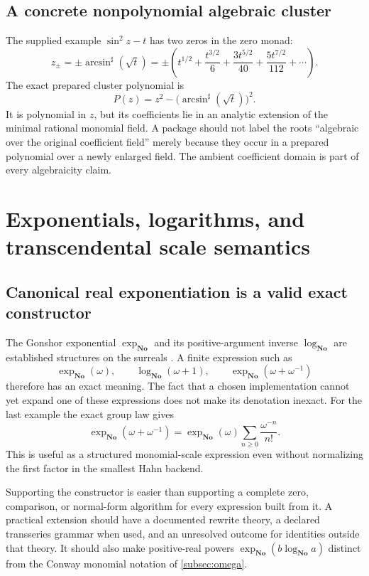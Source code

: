 \documentclass[11pt,letterpaper]{article}
\numberwithin{equation}{section}
\theoremstyle{definition}
\theoremstyle{remark}\newtheorem{remark}[theorem]{Remark}
\newcommand{\No}{\mathbf{No}}
\newcommand{\sh}{^{\sharp}}
\begin{document}
\subsection{A concrete nonpolynomial algebraic cluster}
The supplied example $\sin^2z-t$ has two zeros in the zero monad:
\[
 z_\pm=\pm\arcsin\sh(\sqrt t)
 =\pm\left(t^{1/2}+\frac{t^{3/2}}6+
 \frac{3t^{5/2}}{40}+\frac{5t^{7/2}}{112}+\cdots\right).
\]
The exact prepared cluster polynomial is
\[
 P(z)=z^2-\bigl(\arcsin\sh(\sqrt t)\bigr)^2.
\]
It is polynomial in $z$, but its coefficients lie in an analytic extension
of the minimal rational monomial field. A package should not label the roots
``algebraic over the original coefficient field'' merely because they occur
in a prepared polynomial over a newly enlarged field. The ambient coefficient
domain is part of every algebraicity claim.

\section{Exponentials, logarithms, and transcendental scale semantics}
\label{sec:transcendental}

\subsection{Canonical real exponentiation is a valid exact constructor}
The Gonshor exponential $\exp_{\No}$ and its positive-argument inverse
$\log_{\No}$ are established structures on the surreals
\cite{Gonshor,vdDE}. A finite expression such as
\[
 \exp_{\No}(\omega),\qquad
 \log_{\No}(\omega+1),\qquad
 \exp_{\No}(\omega+\omega^{-1})
\]
therefore has an exact meaning. The fact that a chosen implementation cannot
yet expand one of these expressions does not make its denotation inexact.
For the last example the exact group law gives
\[
 \exp_{\No}(\omega+\omega^{-1})
 =\exp_{\No}(\omega)\sum_{n\ge0}\frac{\omega^{-n}}{n!}.
\]
This is useful as a structured monomial-scale expression even without
normalizing the first factor in the smallest Hahn backend.

Supporting the constructor is easier than supporting a complete zero,
comparison, or normal-form algorithm for every expression built from it.
A practical extension should have a documented rewrite theory, a declared
transseries grammar when used, and an unresolved outcome for identities
outside that theory. It should also make positive-real powers
$\exp_{\No}(b\log_{\No}a)$ distinct from the Conway monomial notation
of \cref{subsec:omega}.
\end{document}
